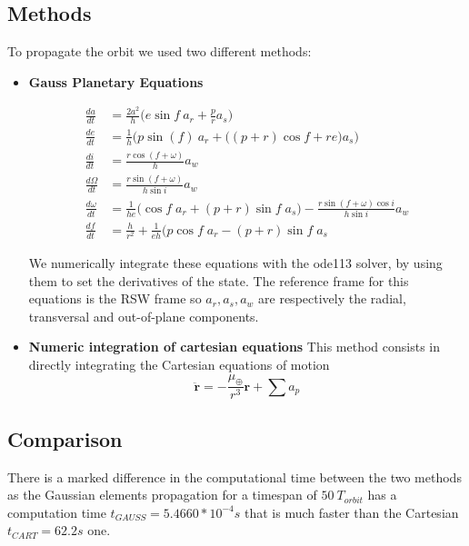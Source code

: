 \documentclass[11pt,a4paper]{report}
\renewcommand{\vec}[1]{\mathbf{#1}}
\begin{document}
\subsection{Methods}
To propagate the orbit we used two different methods:
\begin{itemize}
    \item \textbf{Gauss Planetary Equations}
    \par
    \begin{align*}
        \frac{da}{dt}&=\frac{2a^2}{h}\Big(e\sin f \: a_r +\frac{p}{r}a_s\Big)\\[1]
        \frac{de}{dt}&=\frac{1}{h}\Big(p\sin(f) \: a_r+ \Big( (p+r)\cos f +re \Big) a_s\Big)\\[1]
        \frac{di}{dt} &= \frac{r\cos(f+\omega)}{h}a_w\\[1]
        \frac{d\Omega}{dt}&=\frac{r\sin (f+\omega) }{h \sin i}a_w\\[1]
        \frac{d\omega}{dt}&=\frac{1}{he} \Big( \cos f \; a_r + (p+r)\sin f \; a_s \Big ) - \frac{r\sin(f+\omega)\cos i}{h\sin i} a_w\\[1]
        \frac{df}{dt} &= \frac{h}{r^2} + \frac{1}{eh} \Big(p \cos f \; a_r - (p+r)\sin f \; a_s 
    \end{align*}

    \par
    We numerically integrate these equations with the ode113 solver, by using them to set the derivatives of the state.
    The reference frame for this equations is the RSW frame so $a_r, a_s, a_w$ are respectively the  radial, transversal and out-of-plane components. \cite{RSW_Curtis} \cite{RSW_Vallado} \cite{RSW_Battin}
    
    \item \textbf{Numeric integration of cartesian equations}
    This method consists in directly integrating the Cartesian equations of motion
    \begin{equation}
        \vec{\ddot{r}} = - \frac{\mu_{\oplus}}{r^3}\vec{r} + \sum{a_{p}}
    \end{equation}
    
\end{itemize}

\subsection{Comparison}
\par
There is a marked difference in the computational time between the two methods as the Gaussian elements propagation for a timespan of $50\ T_{orbit}$ has a computation time $t_{GAUSS} = 5.4660*10^{-4} s$ that is much faster than the Cartesian $t_{CART} = 62.2 s$ one.
\end{document}
